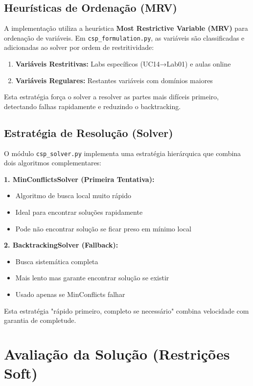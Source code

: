 \documentclass[a4paper, 12pt]{article}
\begin{document}
\subsection{Heurísticas de Ordenação (MRV)}

A implementação utiliza a heurística \textbf{Most Restrictive Variable (MRV)} para ordenação de variáveis. Em \texttt{csp\_formulation.py}, as variáveis são classificadas e adicionadas ao solver por ordem de restritividade:

\begin{enumerate}
    \item \textbf{Variáveis Restritivas:} Labs específicos (UC14→Lab01) e aulas online
    \item \textbf{Variáveis Regulares:} Restantes variáveis com domínios maiores
\end{enumerate}

Esta estratégia força o solver a resolver as partes mais difíceis primeiro, detectando falhas rapidamente e reduzindo o backtracking.

\subsection{Estratégia de Resolução (Solver)}

O módulo \texttt{csp\_solver.py} implementa uma estratégia hierárquica que combina dois algoritmos complementares:

\textbf{1. MinConflictsSolver (Primeira Tentativa):}
\begin{itemize}
    \item Algoritmo de busca local muito rápido
    \item Ideal para encontrar soluções rapidamente
    \item Pode não encontrar solução se ficar preso em mínimo local
\end{itemize}

\textbf{2. BacktrackingSolver (Fallback):}
\begin{itemize}
    \item Busca sistemática completa
    \item Mais lento mas garante encontrar solução se existir
    \item Usado apenas se MinConflicts falhar
\end{itemize}

Esta estratégia "rápido primeiro, completo se necessário" combina velocidade com garantia de completude.

\section{Avaliação da Solução (Restrições Soft)}
\end{document}
